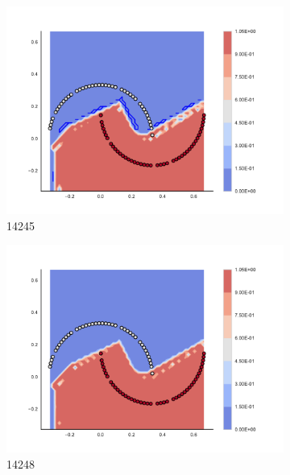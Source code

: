 \begin{figure}[h]
\begin{subfigure}[b]{0.09\textwidth}
    \includegraphics[clip, trim=2.35cm 1.75cm 4.5cm 0cm,width=\textwidth]{img/convergence/14245.pdf}
    \caption{14245}
    \label{fig:convergence_14245}
\end{subfigure}
%
\begin{subfigure}[b]{0.09\textwidth}
    \includegraphics[clip, trim=2.35cm 1.75cm 4.5cm 0cm,width=\textwidth]{img/convergence/14248.pdf}
    \caption{14248}
    \label{fig:convergence_14248}
\end{subfigure}
%
\begin{subfigure}[b]{0.09\textwidth}

\end{subfigure}
\end{figure}
